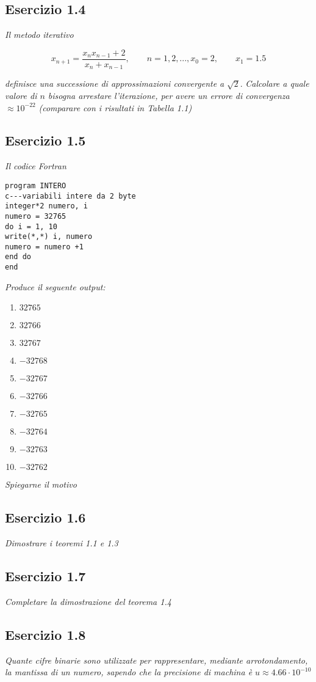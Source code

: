 \subsection{Esercizio 1.4}

\emph{Il metodo iterativo}

$$x_{n+1} = \frac{x_{n}x_{n-1}+2}{x_{n}+x_{n-1}}, \qquad n = 1, 2, ..., x_{0} = 2,\qquad x_{1} = 1.5 $$

\emph{definisce una successione di approssimazioni convergente a} $\sqrt{2}$. \emph{Calcolare a quale valore di $ n $ bisogna arrestare l'iterazione, per avere un errore di convergenza}
$\approx 10^{-22}$ \emph{(comparare con i risultati in Tabella 1.1)}

\subsection{Esercizio 1.5}
\emph{Il codice Fortran}
\lstset{language=[90]Fortran}
\begin{lstlisting} 
program INTERO
c---variabili intere da 2 byte
integer*2 numero, i
numero = 32765
do i = 1, 10
write(*,*) i, numero
numero = numero +1
end do 
end
\end{lstlisting}
\emph{Produce il seguente output:}
\begin{enumerate}
\item $32765$
\item $32766$
\item $32767$
\item $-32768$
\item $-32767$
\item $-32766$
\item $-32765$
\item $-32764$
\item $-32763$
\item $-32762$
\end{enumerate}
\emph{Spiegarne il motivo}


\subsection{Esercizio 1.6}
\emph{Dimostrare i teoremi 1.1 e 1.3}
\subsection{Esercizio 1.7}
\emph{Completare la dimostrazione del teorema 1.4}

\subsection{Esercizio 1.8}
\emph{Quante cifre binarie sono utilizzate per rappresentare, mediante arrotondamento, la mantissa di un numero, sapendo che la precisione di machina è $ u \approx 4.66 \cdot 10^{-10} $}

